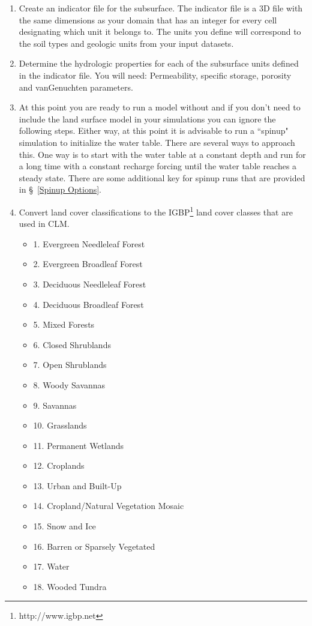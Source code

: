 \begin{enumerate}
   \item Create an indicator file for the subsurface. The indicator file is a 3D  
   file with the same dimensions as your domain that has an integer for every cell 
   designating which unit it belongs to. The units you define will correspond to the soil 
   types and geologic units from your input datasets. 

   \item Determine the hydrologic properties for each of the subsurface units defined in 
   the indicator file. You will need: Permeability, specific storage, porosity and 
   vanGenuchten parameters. 

   \item At this point you are ready to run a \parflow{} model without  and if you 
   don't need to include the land surface model in your simulations you can ignore the 
   following steps. Either way, at this point it is advisable to run a ``spinup" simulation 
   to initialize the water table. There are several ways to approach this. One way is to 
   start with the water table at a constant depth and run for 
   a long time with a constant recharge forcing until the water table reaches a steady 
   state. There are some additional key for spinup runs that are provided in \S~\ref{Spinup Options}.

   \item Convert land cover classifications to the IGBP\footnote{http://www.igbp.net}
   land cover classes that are used in CLM. 
   
   \begin{itemize}
		 \item[] 1. Evergreen Needleleaf Forest
		 \item[] 2. Evergreen Broadleaf Forest
		 \item[] 3. Deciduous Needleleaf Forest
		 \item[] 4. Deciduous Broadleaf Forest
		 \item[] 5. Mixed Forests
		 \item[] 6. Closed Shrublands
		 \item[] 7. Open Shrublands
		 \item[] 8. Woody Savannas
		 \item[] 9. Savannas
     	 \item[] 10. Grasslands
		 \item[] 11. Permanent Wetlands
		 \item[] 12. Croplands
		 \item[] 13. Urban and Built-Up
		 \item[] 14. Cropland/Natural Vegetation Mosaic
		 \item[] 15. Snow and Ice
		 \item[] 16. Barren or Sparsely Vegetated
		 \item[] 17. Water
		 \item[] 18. Wooded Tundra
  \end{itemize}


\end{enumerate}
